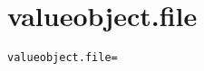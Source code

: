 \section{valueobject.file}
\label{configuration:ValueobjectFile}
\ClearAPI
\TODO
{}
\begin{lstlisting}[style=Props,caption={Usage example for \textit{valueobject.file}}]
valueobject.file=
\end{lstlisting}